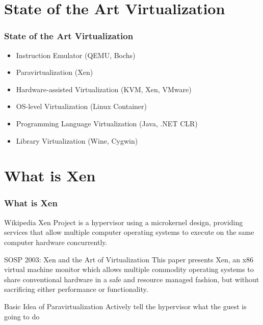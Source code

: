 \documentclass[aspectratio=169]{beamer}
\begin{document}
\section{State of the Art Virtualization}
\begin{frame}
\frametitle{State of the Art Virtualization}
\begin{itemize}
\item Instruction Emulator (QEMU, Bochs) \pause
\item Paravirtualization (Xen) \pause
\item Hardware-assisted Virtualization (KVM, Xen, VMware) \pause
\item OS-level Virtualization (Linux Container) \pause
\item Programming Language Virtualization (Java, .NET CLR) \pause
\item Library Virtualization (Wine, Cygwin)
\end{itemize}
\end{frame}


\section {What is Xen}
\begin{frame}
\frametitle{What is Xen}
\begin{block}{Wikipedia}
Xen Project is a hypervisor using a microkernel design, providing services that allow multiple computer operating systems to execute on the same computer hardware concurrently.
\end{block} \pause
\begin{block}{SOSP 2003: Xen and the Art of Virtualization}
This paper presents Xen, an x86 virtual machine monitor which allows multiple commodity operating systems to share conventional hardware in a safe and resource managed fashion, but without sacrificing either performance or functionality. \pause
\end{block}
\begin{block}{Basic Idea of Paravirtualization}
Actively tell the hypervisor what the guest is going to do
\end{block}
\end{frame}

\end{document}
